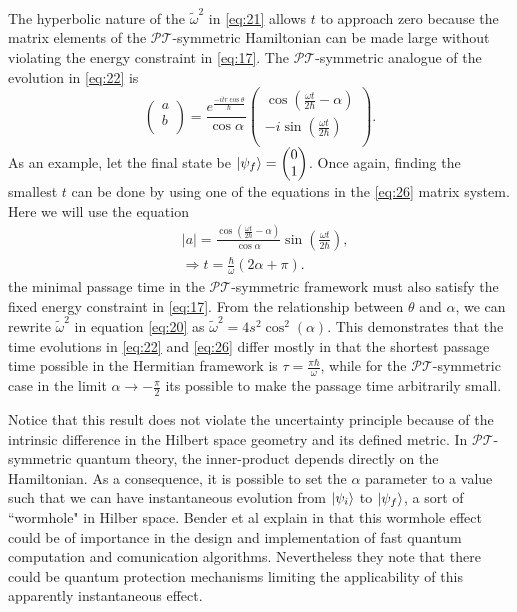 \documentclass[12pt, a4paper]{report}
\newcommand\PT{\(\mathcal{PT}\)}
\begin{document}
The hyperbolic nature of the $\tilde{\omega}^2$ in \ref{eq:21}  allows $t$ to approach zero because the matrix elements of the \PT -symmetric Hamiltonian can be made large without violating the energy constraint in \ref{eq:17}\cite{Bender_2007}. The \PT-symmetric analogue of the evolution in \ref{eq:22} is
\begin{equation}\label{eq:26}
\begin{pmatrix}
a \\
b \\                
\end{pmatrix} = \frac{e^{\frac{-itr \cos\theta}{\hbar}}}{\cos{\alpha}}
\begin{pmatrix}
\cos(\frac{\omega t}{2 \hbar} - \alpha)\\
- i \sin(\frac{\omega t}{2\hbar})\\
\end{pmatrix}.
\end{equation}
As an example, let the final state be $\ket{\psi_f} = \begin{pmatrix}0 \\1 \\\end{pmatrix}$. Once again, finding the smallest $t$ can be done by using one of the equations in the \ref{eq:26} matrix system. Here we will use the equation
\begin{align}\label{eq:27}
&|a|= \frac{\cos(\frac{\omega t}{2 \hbar} -\alpha)}{\cos{\alpha}} \sin\left(\frac{\omega t}{2\hbar}\right),\nonumber\\
&\Rightarrow t = \frac{\hbar}{\omega}(2 \alpha + \pi).
\end{align}
the minimal passage time in the \PT-symmetric framework must also satisfy the fixed energy constraint in \ref{eq:17}. From the relationship between $\theta$ and $\alpha$, we can rewrite $\tilde{\omega}^2$ in equation \ref{eq:20} as $\tilde{\omega}^2 = 4s^2\cos^2(\alpha)$. This demonstrates that the time evolutions in \ref{eq:22} and \ref{eq:26} differ mostly in that the shortest passage time possible in the Hermitian framework is $\tau = \frac{\pi\hbar}{\omega}$, while for the \PT-symmetric case in the limit $\alpha \rightarrow -\frac{\pi}{2}$ its possible to make the passage time arbitrarily small.

Notice that this result does not violate the uncertainty principle because of the intrinsic difference in the Hilbert space geometry and its defined metric. In \PT-symmetric quantum theory, the inner-product depends directly on the
Hamiltonian. As a consequence, it is possible to set the $\alpha$ parameter to a value such that we can have instantaneous evolution from $\ket{\psi_i}$ to $\ket{\psi_f}$, a sort of ``wormhole" in Hilber space. Bender et al explain in \cite{Bender_2007} that this wormhole effect could be of importance in the design and implementation of fast quantum computation and comunication algorithms. Nevertheless they note that there could be quantum protection mechanisms limiting the applicability of this apparently instantaneous effect.
\end{document}
